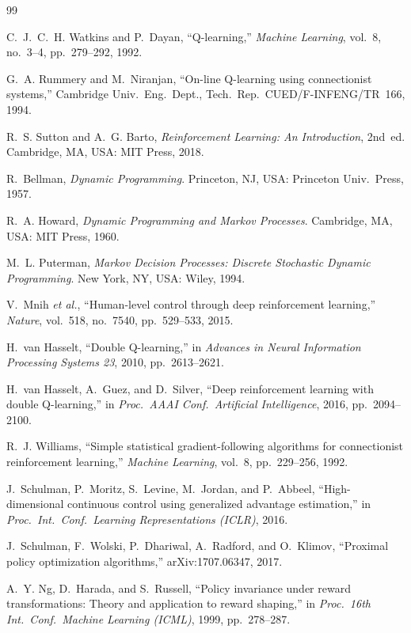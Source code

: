 \begin{thebibliography}{99}
\footnotesize

C.~J.~C.~H. Watkins and P.~Dayan, ``Q-learning,'' \emph{Machine Learning}, vol.~8, no.~3--4, pp.~279--292, 1992.

G.~A. Rummery and M.~Niranjan, ``On-line Q-learning using connectionist systems,'' Cambridge Univ.\ Eng.\ Dept., Tech.\ Rep.\ CUED/F-INFENG/TR~166, 1994.

R.~S. Sutton and A.~G. Barto, \emph{Reinforcement Learning: An Introduction}, 2nd~ed. Cambridge, MA, USA: MIT Press, 2018.

R.~Bellman, \emph{Dynamic Programming}. Princeton, NJ, USA: Princeton Univ.\ Press, 1957.

R.~A. Howard, \emph{Dynamic Programming and Markov Processes}. Cambridge, MA, USA: MIT Press, 1960.

M.~L. Puterman, \emph{Markov Decision Processes: Discrete Stochastic Dynamic Programming}. New York, NY, USA: Wiley, 1994.

V.~Mnih \emph{et al.}, ``Human-level control through deep reinforcement learning,'' \emph{Nature}, vol.~518, no.~7540, pp.~529--533, 2015.

H.~van Hasselt, ``Double Q-learning,'' in \emph{Advances in Neural Information Processing Systems 23}, 2010, pp.~2613--2621.

H.~van Hasselt, A.~Guez, and D.~Silver, ``Deep reinforcement learning with double Q-learning,'' in \emph{Proc.\ AAAI Conf.\ Artificial Intelligence}, 2016, pp.~2094--2100.

R.~J. Williams, ``Simple statistical gradient-following algorithms for connectionist reinforcement learning,'' \emph{Machine Learning}, vol.~8, pp.~229--256, 1992.

J.~Schulman, P.~Moritz, S.~Levine, M.~Jordan, and P.~Abbeel, ``High-dimensional continuous control using generalized advantage estimation,'' in \emph{Proc.\ Int.\ Conf.\ Learning Representations (ICLR)}, 2016.

J.~Schulman, F.~Wolski, P.~Dhariwal, A.~Radford, and O.~Klimov, ``Proximal policy optimization algorithms,'' arXiv:1707.06347, 2017.

A.~Y. Ng, D.~Harada, and S.~Russell, ``Policy invariance under reward transformations: Theory and application to reward shaping,'' in \emph{Proc.\ 16th Int.\ Conf.\ Machine Learning (ICML)}, 1999, pp.~278--287.


\end{thebibliography}
